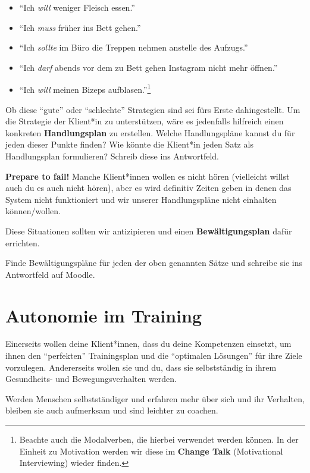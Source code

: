 \documentclass[
  letterpaper,
  DIV=11,
  numbers=noendperiod]{scrreprt}
\providecommand{\tightlist}{%
  \setlength{\itemsep}{0pt}\setlength{\parskip}{0pt}}
\begin{document}
\begin{itemize}
\tightlist
\item
  ``Ich \emph{will} weniger Fleisch essen.''
\item
  ``Ich \emph{muss} früher ins Bett gehen.''
\item
  ``Ich \emph{sollte} im Büro die Treppen nehmen anstelle des Aufzugs.''
\item
  ``Ich \emph{darf} abends vor dem zu Bett gehen Instagram nicht mehr
  öffnen.''
\item
  ``Ich \emph{will} meinen Bizeps aufblasen.''\footnote{Beachte auch die
    Modalverben, die hierbei verwendet werden können. In der Einheit zu
    Motivation werden wir diese im \textbf{Change Talk} (Motivational
    Interviewing) wieder finden.}
\end{itemize}

Ob diese ``gute'' oder ``schlechte'' Strategien sind sei fürs Erste
dahingestellt. Um die Strategie der Klient*in zu unterstützen, wäre es
jedenfalls hilfreich einen konkreten \textbf{Handlungsplan} zu
erstellen. Welche Handlungspläne kannst du für jeden dieser Punkte
finden? Wie könnte die Klient*in jeden Satz als Handlungsplan
formulieren? Schreib diese ins Antwortfeld.

\textbf{Prepare to fail!} Manche Klient*innen wollen es nicht hören
(vielleicht willst auch du es auch nicht hören), aber es wird definitiv
Zeiten geben in denen das System nicht funktioniert und wir unserer
Handlungspläne nicht einhalten können/wollen.

Diese Situationen sollten wir antizipieren und einen
\textbf{Bewältigungsplan} dafür errichten.

Finde Bewältigungspläne für jeden der oben genannten Sätze und schreibe
sie ins Antwortfeld auf Moodle.

\section{Autonomie im Training}\label{autonomie-im-training}

Einerseits wollen deine Klient*innen, dass du deine Kompetenzen
einsetzt, um ihnen den ``perfekten'' Trainingsplan und die ``optimalen
Lösungen'' für ihre Ziele vorzulegen. Andererseits wollen sie und du,
dass sie selbstständig in ihrem Gesundheits- und Bewegungsverhalten
werden.

Werden Menschen selbstständiger und erfahren mehr über sich und ihr
Verhalten, bleiben sie auch aufmerksam und sind leichter zu coachen.
\end{document}
